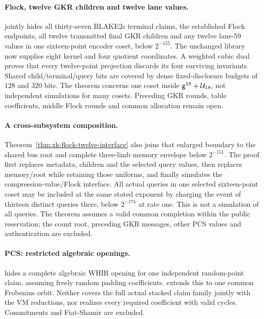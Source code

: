 \paragraph{Flock, twelve GKR children and twelve lane values.}  jointly hides all thirty-seven BLAKE2s terminal claims, the established Flock endpoints, all twelve transmitted final GKR children and any twelve lane-$59$ values in one sixteen-point encoder coset, below $2^{-155}$. The unchanged library now supplies eight kernel and four quotient coordinates. A weighted cubic dual proves that every twelve-point projection discards its four surviving invariants. Shared child/terminal/query bits are covered by dense fixed-disclosure budgets of $128$ and $320$ bits. The theorem concerns one coset inside $\mathsf{g}^{18}+\mathcal{U}_{18}$, not independent simulations for many cosets. Preceding GKR rounds, table coefficients, middle Flock rounds and common allocation remain open.

\paragraph{A cross-subsystem composition.} Theorem~\ref{thm:zk-flock-twelve-interface} also joins that enlarged boundary to the shared bus root and complete three-limb memory envelope below $2^{-151}$. The proof first replaces metadata, children and the selected query values, then replaces memory/root while retaining those uniforms, and finally simulates the compression-value/Flock interface. All actual queries in one selected sixteen-point coset may be included at the same stated exponent by charging the event of thirteen distinct queries there, below $2^{-174}$ at rate one. This is not a simulation of all queries. The theorem assumes a valid common completion within the public reservation; the count root, preceding GKR messages, other PCS values and authentication are excluded.

\paragraph{PCS: restricted algebraic openings.}  hides a complete algebraic WHIR opening for one independent random-point claim, assuming freely random padding coefficients.  extends this to one common Frobenius orbit. Neither covers the full actual stacked claim family jointly with the VM reductions, nor realizes every required coefficient with valid cycles. Commitments and Fiat-Shamir are excluded.


